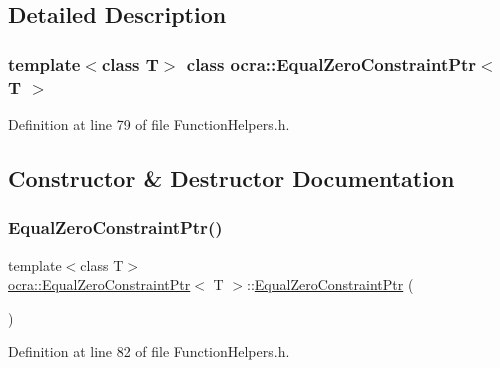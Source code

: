 \subsection{Detailed Description}
\subsubsection*{template$<$class T$>$\newline
class ocra\+::\+Equal\+Zero\+Constraint\+Ptr$<$ T $>$}



Definition at line 79 of file Function\+Helpers.\+h.



\subsection{Constructor \& Destructor Documentation}
\hypertarget{classocra_1_1EqualZeroConstraintPtr_a3c2ba882cedf01952626c420b3020b8f}{}\label{classocra_1_1EqualZeroConstraintPtr_a3c2ba882cedf01952626c420b3020b8f} 
\subsubsection{\texorpdfstring{Equal\+Zero\+Constraint\+Ptr()}{EqualZeroConstraintPtr()}\hspace{0.1cm}{\footnotesize\ttfamily [1/2]}}
{\footnotesize\ttfamily template$<$class T$>$ \\
\hyperlink{classocra_1_1EqualZeroConstraintPtr}{ocra\+::\+Equal\+Zero\+Constraint\+Ptr}$<$ T $>$\+::\hyperlink{classocra_1_1EqualZeroConstraintPtr}{Equal\+Zero\+Constraint\+Ptr} (\begin{DoxyParamCaption}{ }\end{DoxyParamCaption})\hspace{0.3cm}{\ttfamily [inline]}}



Definition at line 82 of file Function\+Helpers.\+h.

\hypertarget{classocra_1_1EqualZeroConstraintPtr_a6a3937dc3d22626cb3aaf3536256aee8}{}\label{classocra_1_1EqualZeroConstraintPtr_a6a3937dc3d22626cb3aaf3536256aee8} 

